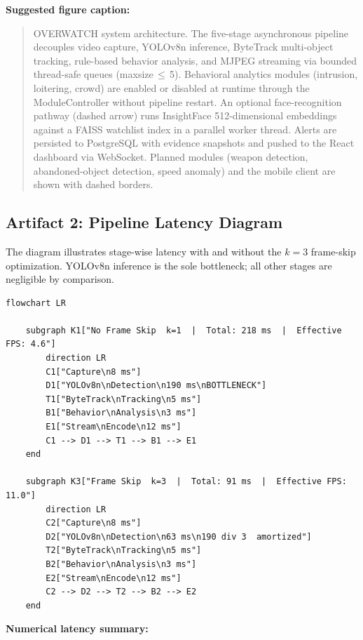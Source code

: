 \documentclass[11pt]{article}
\begin{document}
\textbf{Suggested figure caption:}

\begin{quote}
OVERWATCH system architecture. The five-stage asynchronous pipeline decouples video capture, YOLOv8n inference, ByteTrack multi-object tracking, rule-based behavior analysis, and MJPEG streaming via bounded thread-safe queues (maxsize\,$\leq$\,5). Behavioral analytics modules (intrusion, loitering, crowd) are enabled or disabled at runtime through the ModuleController without pipeline restart. An optional face-recognition pathway (dashed arrow) runs InsightFace 512-dimensional embeddings against a FAISS watchlist index in a parallel worker thread. Alerts are persisted to PostgreSQL with evidence snapshots and pushed to the React dashboard via WebSocket. Planned modules (weapon detection, abandoned-object detection, speed anomaly) and the mobile client are shown with dashed borders.
\end{quote}

\subsection{Artifact 2: Pipeline Latency Diagram}

The diagram illustrates stage-wise latency with and without the $k=3$ frame-skip optimization. YOLOv8n inference is the sole bottleneck; all other stages are negligible by comparison.

\begin{verbatim}
flowchart LR

    subgraph K1["No Frame Skip  k=1  |  Total: 218 ms  |  Effective FPS: 4.6"]
        direction LR
        C1["Capture\n8 ms"]
        D1["YOLOv8n\nDetection\n190 ms\nBOTTLENECK"]
        T1["ByteTrack\nTracking\n5 ms"]
        B1["Behavior\nAnalysis\n3 ms"]
        E1["Stream\nEncode\n12 ms"]
        C1 --> D1 --> T1 --> B1 --> E1
    end

    subgraph K3["Frame Skip  k=3  |  Total: 91 ms  |  Effective FPS: 11.0"]
        direction LR
        C2["Capture\n8 ms"]
        D2["YOLOv8n\nDetection\n63 ms\n190 div 3  amortized"]
        T2["ByteTrack\nTracking\n5 ms"]
        B2["Behavior\nAnalysis\n3 ms"]
        E2["Stream\nEncode\n12 ms"]
        C2 --> D2 --> T2 --> B2 --> E2
    end
\end{verbatim}

\textbf{Numerical latency summary:}
\end{document}
